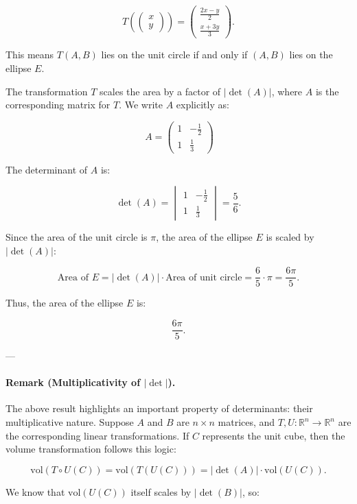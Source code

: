 \documentclass[a4paper,12pt]{article}
\begin{document}
\[
T\left(\begin{pmatrix} x \\ y \end{pmatrix}\right) = \begin{pmatrix} \frac{2x - y}{2} \\ \frac{x + 3y}{3} \end{pmatrix}.
\]

This means \( T(A, B) \) lies on the unit circle if and only if \( (A, B) \) lies on the ellipse \( E \).

The transformation \( T \) scales the area by a factor of \( |\det(A)| \), where \( A \) is the corresponding matrix for \( T \). We write \( A \) explicitly as:

\[
\ A = 
\begin{pmatrix}
1 & -\frac{1}{2} \\
1 & \frac{1}{3}
\end{pmatrix}
\]

The determinant of \( A \) is:

\[
\det(A) = \begin{vmatrix} 1 & -\frac{1}{2} \\
1 & \frac{1}{3} \end{vmatrix} = \frac{5}{6}.
\]

Since the area of the unit circle is \( \pi \), the area of the ellipse \( E \) is scaled by \( |\det(A)| \):

\[
\text{Area of } E = |\det(A)| \cdot \text{Area of unit circle} = \frac{6}{5} \cdot \pi = \frac{6\pi}{5}.
\]

Thus, the area of the ellipse \( E \) is:

\[
\boxed{\frac{6\pi}{5}.}
\]

---

\paragraph{Remark (Multiplicativity of \( |\det| \)).} The above result highlights an important property of determinants: their multiplicative nature. Suppose \( A \) and \( B \) are \( n \times n \) matrices, and \( T, U: \mathbb{R}^n \to \mathbb{R}^n \) are the corresponding linear transformations. If \( C \) represents the unit cube, then the volume transformation follows this logic:

\[
\text{vol}(T \circ U(C)) = \text{vol}(T(U(C))) = |\det(A)| \cdot \text{vol}(U(C)).
\]

We know that \( \text{vol}(U(C)) \) itself scales by \( |\det(B)| \), so:
\end{document}
